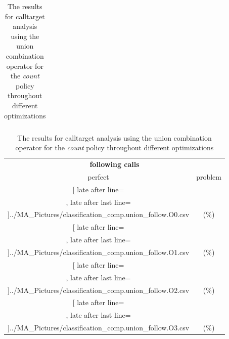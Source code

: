 \begin{table}[!htbp]
{\begin{tabular}{l|c|c|c}
    	\end{tabular}

	\begin{tabular}{|c|c}%

	\toprule
	\multicolumn{2}{c}{\bfseries following calls}\\
	
	perfect &  problem %
	\\\midrule
	\csvreader[ late after line=\\, late after last line=\\\midrule]{../MA_Pictures/classification_comp.union_follow.O0.csv}{
}
	{\csvcolxiii (\csvcolxiv \%) & \csvcolxv (\csvcolxvi \%)}%



\multicolumn{1}{c}{} 
	\\\midrule
	\csvreader[ late after line=\\, late after last line=\\\midrule]{../MA_Pictures/classification_comp.union_follow.O1.csv}{
}
	{\csvcolxiii (\csvcolxiv \%) & \csvcolxv (\csvcolxvi \%)}%
	
	
\multicolumn{1}{c}{}
	\\\midrule
	\csvreader[ late after line=\\, late after last line=\\\midrule]{../MA_Pictures/classification_comp.union_follow.O2.csv}{
}
	{\csvcolxiii (\csvcolxiv \%) & \csvcolxv (\csvcolxvi \%)}%
	

\multicolumn{1}{c}{}
	\\\midrule
	\csvreader[ late after line=\\, late after last line=\\\bottomrule]{../MA_Pictures/classification_comp.union_follow.O3.csv}{
}
	{\csvcolxiii (\csvcolxiv \%) & \csvcolxv (\csvcolxvi \%)}%


    	\end{tabular}
}
		\caption {The results for calltarget analysis using the union combination operator for the \textit{count} policy throughout different optimizations}
		\label{tbl:CTunionCOUNT}
\end{table}

